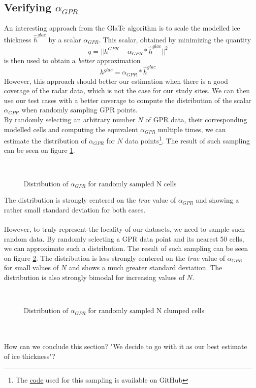 \documentclass[a4, 12pt]{article}
\begin{document}
\FloatBarrier

\subsection{Verifying $\alpha_{GPR}$}

An interesting approach from the GlaTe algorithm is to scale the modelled ice thickness $\hat{h}^{glac}$ by a scalar $\alpha_{GPR}$. This scalar, obtained by minimizing the quantity 
\[q = ||h^{GPR} - \alpha_{GPR}*\hat{h}^{glac}||^2\] is then used to obtain a \textit{better} approximation \[h^{glac} = \alpha_{GPR}*\hat{h}^{glac} \]
However, this approach should better our estimation when there is a good coverage of the radar data, which is not the case for our study sites. We can then use our test cases with a better coverage to compute the distribution of the scalar $\alpha_{GPR}$ when randomly sampling GPR points.
\\
By randomly selecting an arbitrary number $N$ of GPR data, their corresponding modelled cells and computing the equivalent $\alpha_{GPR}$ multiple times, we can estimate the distribution of $\alpha_{GPR}$ for $N$ data points\footnote{The \href{https://github.com/aleximorin/USRA-2020-AlexiMorin/blob/master/compare_alpha.py}{code} used for this sampling is available on GitHub}. The result of such sampling can be seen on figure \ref{fig:alpha_dist}.
\begin{figure}[h!]
\\
\caption{Distribution of $\alpha_{GPR}$ for randomly sampled N cells}
\label{fig:alpha_dist}
\end{figure}
The distribution is strongly centered on the \textit{true} value of $\alpha_{GPR}$ and showing a rather small standard deviation for both cases. 
\\
\\
However, to truly represent the locality of our datasets, we need to sample such random data. By randomly selecting a GPR data point and its nearest 50 cells, we can approximate such a distribution. The result of such sampling can be seen on figure \ref{fig:alpha_dist_block}.
The distribution is less strongly centered on the \textit{true} value of $\alpha_{GPR}$ for small values of $N$ and shows a much greater standard deviation. The distribution is also strongly bimodal for increasing values of $N$. 
\begin{figure}[h!]
\\
\caption{Distribution of $\alpha_{GPR}$ for randomly sampled N clumped cells}
\label{fig:alpha_dist_block}
\end{figure}
\\
\\
How can we conclude this section? "We decide to go with it as our best estimate of ice thickness"?
\FloatBarrier
\end{document}
